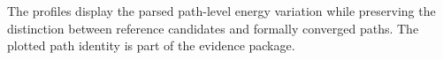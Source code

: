 The profiles display the parsed path-level energy variation while preserving the distinction between reference candidates and formally converged paths. The plotted path identity is part of the evidence package.
